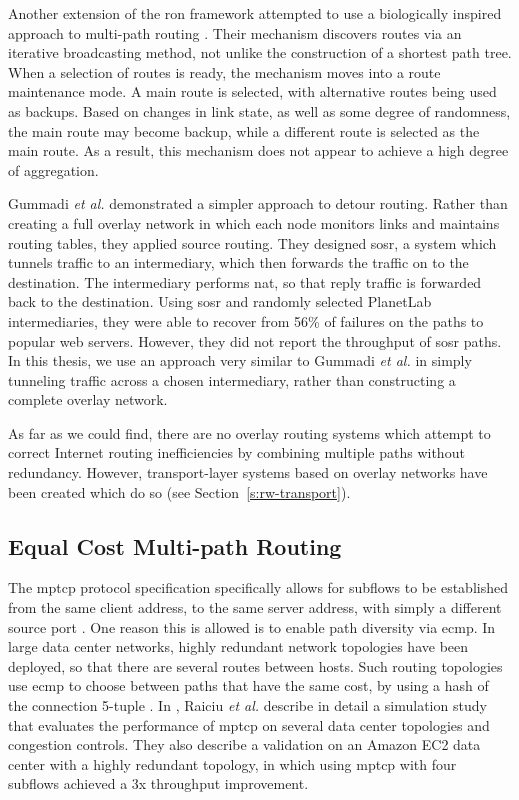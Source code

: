 \documentclass{cwru}
\begin{document}
Another extension of the \ac{ron} framework attempted to use a biologically
inspired approach to multi-path routing \cite{leibnitz2006biologically}. Their
mechanism discovers routes via an iterative broadcasting method, not unlike the
construction of a shortest path tree. When a selection of routes is ready, the
mechanism moves into a route maintenance mode. A main route is selected, with
alternative routes being used as backups. Based on changes in link state, as
well as some degree of randomness, the main route may become backup, while a
different route is selected as the main route. As a result, this mechanism does
not appear to achieve a high degree of aggregation.

Gummadi \textit{et al.} \cite{gummadi2004improving} demonstrated a simpler
approach to detour routing. Rather than creating a full overlay network in which
each node monitors links and maintains routing tables, they applied source
routing. They designed \ac{sosr}, a system which tunnels traffic to an
intermediary, which then forwards the traffic on to the destination. The
intermediary performs \ac{nat}, so that reply traffic is forwarded back to the
destination. Using \ac{sosr} and randomly selected PlanetLab intermediaries,
they were able to recover from 56\% of failures on the paths to popular web
servers. However, they did not report the throughput of \ac{sosr} paths. In this
thesis, we use an approach very similar to Gummadi \textit{et al.} in simply
tunneling traffic across a chosen intermediary, rather than constructing a
complete overlay network.

As far as we could find, there are no overlay routing systems which attempt to
correct Internet routing inefficiencies by combining multiple paths without
redundancy. However, transport-layer systems based on overlay networks have been
created which do so (see Section~\ref{s:rw-transport}).

\subsection{Equal Cost Multi-path Routing}

The \ac{mptcp} protocol specification specifically allows for subflows to be
established from the same client address, to the same server address, with
simply a different source port \cite{rfc6824}. One reason this is allowed is to
enable path diversity via \ac{ecmp}. In large data center networks, highly
redundant network topologies have been deployed, so that there are several
routes between hosts. Such routing topologies use \ac{ecmp} to choose between
paths that have the same cost, by using a hash of the connection 5-tuple
\cite{raiciu2011improving}. In \cite{raiciu2011improving}, Raiciu \textit{et
  al.} describe in detail a simulation study that evaluates the performance of
\ac{mptcp} on several data center topologies and congestion controls. They also
describe a validation on an Amazon EC2 data center with a highly redundant
topology, in which using \ac{mptcp} with four subflows achieved a 3x throughput
improvement.
\end{document}
